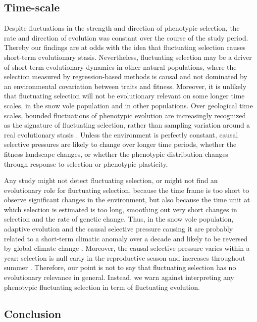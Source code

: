 \subsection*{Time-scale} 
Despite fluctuations in the strength and direction of phenotypic selection, the rate and direction of evolution was constant over the course of the study period. Thereby our findings are at odds with the idea that fluctuating selection causes short-term evolutionary stasis. Nevertheless, fluctuating selection may be a driver of short-term evolutionary dynamics in other natural populations, where the selection measured by regression-based methods is causal and not dominated by an environmental covariation between traits and fitness. Moreover, it is unlikely that fluctuating selection will not be evolutionary relevant on some longer time scales, in the snow vole population and in other populations.  Over geological time scales, bounded fluctuations of phenotypic evolution are increasingly recognized as the signature of fluctuating selection, rather than sampling variation around a real evolutionary stasis \parencite{Uyeda2011, Voje2015}. Unless the environment is perfectly constant, causal selective pressures are likely to change over longer time periods, whether the fitness landscape changes, or whether the phenotypic distribution changes through response to selection or phenotypic plasticity. 

Any study might not detect fluctuating selection, or might not find an evolutionary role for fluctuating selection, because the time frame is too short to observe significant changes in the environment, but also because the time unit at which selection is estimated is too long, smoothing out very short changes in selection and the rate of genetic change. Thus, in the snow vole population, adaptive evolution and the causal selective pressure causing it are probably related to a short-term climatic anomaly over a decade and likely to be reversed by global climate change \parencite{Bonnet2016}. Moreover, the causal selective pressure varies within a year: selection is null early in the reproductive season and increases throughout summer \parencite{Bonnet2016}.
Therefore, our point is not to say that fluctuating selection has no evolutionary relevance in general. Instead, we warn against interpreting any phenotypic fluctuating selection in term of fluctuating evolution. 

\subsection*{Conclusion} 

